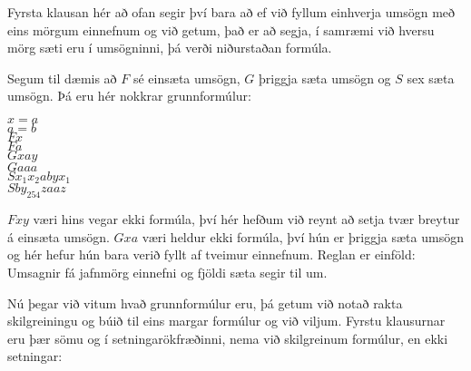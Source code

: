 Fyrsta klausan hér að ofan segir því bara að ef við fyllum einhverja umsögn með eins mörgum einnefnum og við getum, það er að segja, í samræmi við hversu mörg sæti eru í umsögninni, þá verði niðurstaðan formúla.

Segum til dæmis að $F$ sé einsæta umsögn, $G$ þriggja sæta umsögn og $S$ sex sæta umsögn. Þá eru hér nokkrar grunnformúlur:
	\begin{center}
		$x = a$\\
		$a = b$\\
		$Fx$\\
		$Fa$\\
		$Gxay$\\
		$Gaaa$\\
		$Sx_1 x_2 a b y x_1$\\
		$Sby_{254} z a a z$
	\end{center}
$Fxy$ væri hins vegar ekki formúla, því hér hefðum við reynt að setja tvær breytur á einsæta umsögn. $Gxa$ væri heldur ekki formúla, því hún er þriggja sæta umsögn og hér hefur hún bara verið fyllt af tveimur einnefnum. Reglan er einföld: Umsagnir fá jafnmörg einnefni og fjöldi sæta segir til um.

Nú þegar við vitum hvað grunnformúlur eru, þá getum við notað rakta skilgreiningu og búið til eins margar formúlur og við viljum. Fyrstu klausurnar eru þær sömu og í setningarökfræðinni, nema við skilgreinum formúlur, en ekki setningar:
	
